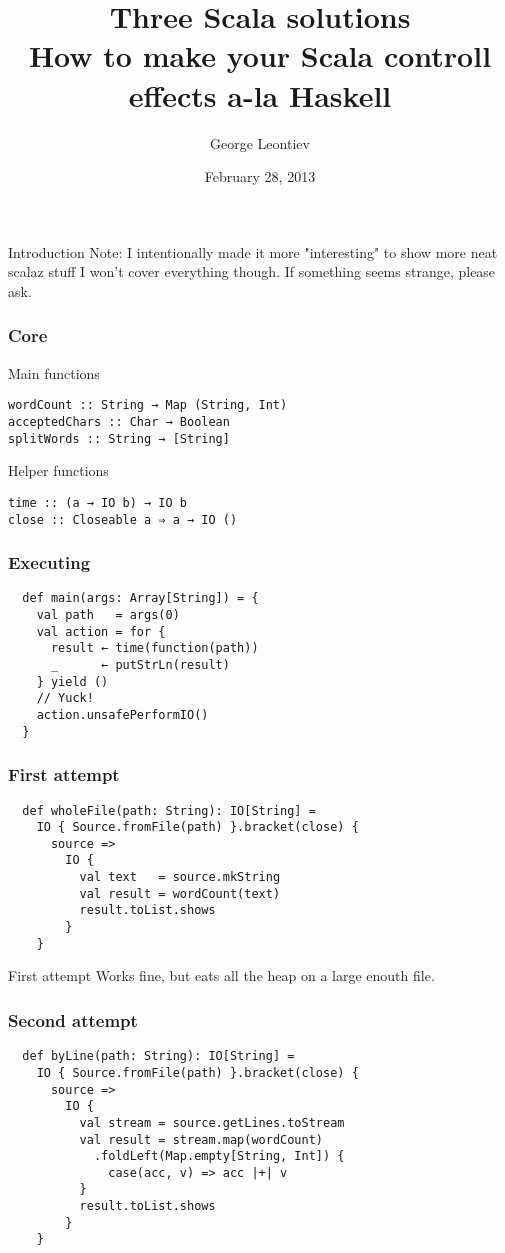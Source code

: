 \documentclass{beamer}
\title[Three Scala solutions]{Three Scala solutions\\How to make your Scala controll effects a-la Haskell}
\author{George Leontiev}
\institute{folone.info}
\date{February 28, 2013}
\begin{document}
\begin{frame}
\titlepage
\end{frame}


\begin{frame}{Introduction}
  Note: I intentionally made it more "interesting" to show more neat scalaz stuff\newline
  I won't cover everything though. If something seems strange, please ask.
\end{frame}

\begin{frame}[fragile]
\frametitle{Core}
Main functions
\begin{lstlisting}
wordCount :: String → Map (String, Int)
acceptedChars :: Char → Boolean
splitWords :: String → [String]
\end{lstlisting}
Helper functions
\begin{lstlisting}
time :: (a → IO b) → IO b
close :: Closeable a ⇒ a → IO ()
\end{lstlisting}
\end{frame}

\begin{frame}[fragile]
\frametitle{Executing}
\begin{lstlisting}
  def main(args: Array[String]) = {
    val path   = args(0)
    val action = for {
      result ← time(function(path))
      _      ← putStrLn(result)
    } yield ()
    // Yuck!
    action.unsafePerformIO()
  }
\end{lstlisting}
\end{frame}

\begin{frame}[fragile]
\frametitle{First attempt}
\begin{lstlisting}
  def wholeFile(path: String): IO[String] =
    IO { Source.fromFile(path) }.bracket(close) {
      source =>
        IO {
          val text   = source.mkString
          val result = wordCount(text)
          result.toList.shows
        }
    }
\end{lstlisting}
\end{frame}

\begin{frame}{First attempt}
  Works fine, but eats all the heap on a large enouth file.
\end{frame}

\begin{frame}[fragile]
\frametitle{Second attempt}
\begin{lstlisting}
  def byLine(path: String): IO[String] =
    IO { Source.fromFile(path) }.bracket(close) {
      source =>
        IO {
          val stream = source.getLines.toStream
          val result = stream.map(wordCount)
            .foldLeft(Map.empty[String, Int]) {
              case(acc, v) => acc |+| v
          }
          result.toList.shows
        }
    }
\end{lstlisting}
\end{frame}
\end{document}

